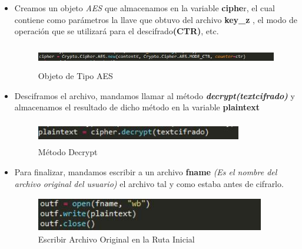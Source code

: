 \begin{itemize}
		\item Creamos un objeto \textit{AES} que almacenamos en la variable \textbf{ciphe}r, el cual contiene como parámetros la llave que obtuvo del archivo \textbf{key\_z }, el modo de operación que se utilizará para el descifrado\textbf{(CTR)}, etc.
			\begin{figure}[H]
			\centering
			\includegraphics[width=15cm, height=1cm]{./images/cifrado/03.jpg}
			\caption{Objeto de Tipo AES}
			\label{fig:6-3-4} 
			\end{figure} 


		\item Desciframos el archivo, mandamos llamar al método \textbf{\textit{decrypt(textcifrado)}}  y almacenamos el resultado de dicho método en la variable \textbf{plaintext}
			\begin{figure}[H]
			\centering
			\includegraphics[width=9cm, height=1cm]{./images/descifrado/05.jpg}
			\caption{Método Decrypt}
			\label{fig:6-3-5} 
			\end{figure} 

		\item Para finalizar, mandamos escribir a un archivo \textbf{fname} \textit{(Es el nombre del archivo original del usuario)} el archivo tal y como estaba antes de cifrarlo. 
			\begin{figure}[H]
			\centering
			\includegraphics[width=10cm, height=1.5cm]{./images/descifrado/06.jpg}
			\caption{Escribir Archivo Original en la Ruta Inicial}
			\label{fig:6-3-6} 
			\end{figure} 

\end{itemize}





